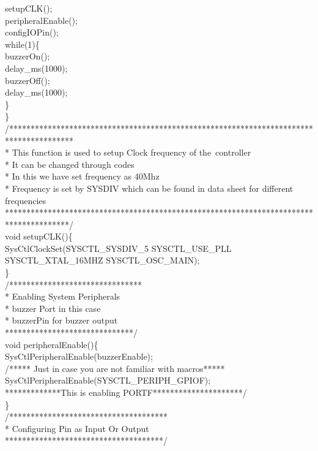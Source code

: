 \documentclass[a4paper,10pt,oneside]{article}
\begin{document}
				setupCLK();\\
				peripheralEnable();\\
				configIOPin();\\
				while(1)\{\\
					buzzerOn();\\
					delay\_ms(1000);\\
					buzzerOff();\\
					delay\_ms(1000);\\
			\}\\
			\}\\
			/***************************************************************************************\\
			* This function is used to setup Clock frequency of the\ controller\\
			* It can be changed through codes\\
			* In this we have set frequency as 40Mhz\\
			* Frequency is set by SYSDIV which can be found in data sheet for different frequencies\\
			***************************************************************************************/\\
			void setupCLK()\{\\
				SysCtlClockSet(SYSCTL\_SYSDIV\_5 \vert SYSCTL\_USE\_PLL \vert SYSCTL\_XTAL\_16MHZ \vert SYSCTL\_OSC\_MAIN);\\
			\}\\
			/*******************************\\
			* Enabling System Peripherals\\
			* buzzer Port in this case\\
			* buzzerPin for buzzer output\\
			******************************/\\
			void peripheralEnable()\{\\
				SysCtlPeripheralEnable(buzzerEnable);\\
				/***** Just in case you are not familiar with macros*****
				SysCtlPeripheralEnable(SYSCTL\_PERIPH\_GPIOF);\\
				*************This is enabling PORTF*********************/\\
			\}\\
			/*************************************\\
			* Configuring Pin as Input Or Output\\
			*************************************/\\
\end{document}
